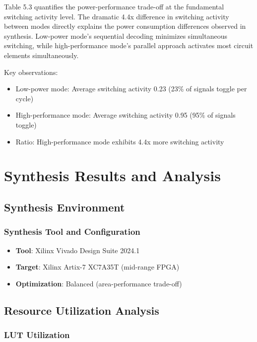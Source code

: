 \documentclass[15pt,a4paper]{report}
\begin{document}
Table 5.3 quantifies the power-performance trade-off at the fundamental switching activity level. The dramatic 4.4x difference in switching activity between modes directly explains the power consumption differences observed in synthesis. Low-power mode's sequential decoding minimizes simultaneous switching, while high-performance mode's parallel approach activates most circuit elements simultaneously.

Key observations:
\begin{itemize}
    \item Low-power mode: Average switching activity 0.23 (23\% of signals toggle per cycle)
    \item High-performance mode: Average switching activity 0.95 (95\% of signals toggle)
    \item Ratio: High-performance mode exhibits 4.4x more switching activity
\end{itemize}

\newpage

\chapter{Synthesis Results and Analysis}

\section{Synthesis Environment}

\subsection{Synthesis Tool and Configuration}

\begin{itemize}
    \item \textbf{Tool}: Xilinx Vivado Design Suite 2024.1
    \item \textbf{Target}: Xilinx Artix-7 XC7A35T (mid-range FPGA)
    \item \textbf{Optimization}: Balanced (area-performance trade-off)
\end{itemize}

\section{Resource Utilization Analysis}

\subsection{LUT Utilization}
\end{document}
